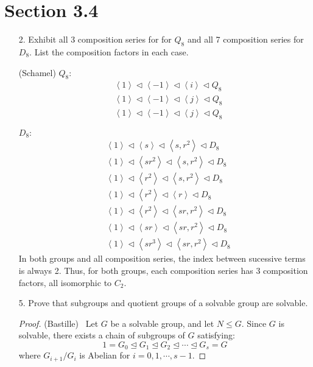 \documentclass[10pt]{article}
\newcommand{\normsubeq}{\trianglelefteq}
\newcommand{\normsub}{\triangleleft}
\newcommand{\gen}[1]{\left\langle #1 \right\rangle}
\begin{document}
\section*{Section 3.4}

\begin{itemize}

\item[2.]  Exhibit all 3 composition series for for $Q_8$ and all 7 composition series for $D_8$.  List the composition factors in each case.

(Schamel)
$Q_8:$
\begin{align*}
  &\gen{1} \normsub \gen{-1} \normsub \gen{i} \normsub Q_8 \\
  &\gen{1} \normsub \gen{-1} \normsub \gen{j} \normsub Q_8 \\
  &\gen{1} \normsub \gen{-1} \normsub \gen{j} \normsub Q_8 
\end{align*} 

$D_8:$
\begin{align*}
  &\gen{1} \normsub \gen{s} \normsub \gen{s,r^2} \normsub D_8 \\
  &\gen{1} \normsub \gen{sr^2} \normsub \gen{s,r^2} \normsub D_8 \\
  &\gen{1} \normsub \gen{r^2} \normsub \gen{s,r^2} \normsub D_8 \\
  &\gen{1} \normsub \gen{r^2} \normsub \gen{r} \normsub D_8 \\
  &\gen{1} \normsub \gen{r^2} \normsub \gen{sr,r^2} \normsub D_8 \\
  &\gen{1} \normsub \gen{sr} \normsub \gen{sr,r^2} \normsub D_8 \\
  &\gen{1} \normsub \gen{sr^3} \normsub \gen{sr,r^2} \normsub D_8 
\end{align*} 
In both groups and all composition series, the index between sucessive terms is always 2.  Thus, for both groups, each composition series has 3 composition factors, all isomorphic to $C_2$. 

\item[5.] Prove that subgroups and quotient groups of a solvable group are solvable.
\begin{proof} (Bastille) \ Let $G$ be a solvable group, and let $N \leq G$. Since $G$ is solvable, there exists a chain of subgroups of $G$ satisfying:
\begin{equation*}
1=G_0 \normsubeq G_1 \normsubeq G_2 \normsubeq \cdots \normsubeq
G_s=G
\end{equation*}
where $G_{i+1}/G_i$ is Abelian for $i=0,1, \cdots, s-1$.


\end{proof}
\end{itemize}
\end{document}
